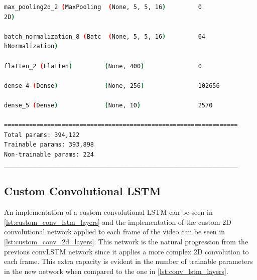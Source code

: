 \begin{lstlisting}[language=Bash,caption={Overview of layers in Convolutional LTSM network.},label={lst:conv_lstm_layers},numbers=none,float=htb]
max_pooling2d_2 (MaxPooling  (None, 5, 5, 16)         0         
2D)                                                             
                                                                
batch_normalization_8 (Batc  (None, 5, 5, 16)         64        
hNormalization)                                                 
                                                                
flatten_2 (Flatten)         (None, 400)               0         
                                                                
dense_4 (Dense)             (None, 256)               102656    
                                                                
dense_5 (Dense)             (None, 10)                2570      
                                                                
=================================================================
Total params: 394,122
Trainable params: 393,898
Non-trainable params: 224
_________________________________________________________________
\end{lstlisting}

\subsection{Custom Convolutional LSTM}

An implementation of a custom convolutional LSTM can be seen in \cref{lst:custom_conv_lstm_layers} and the implementation of the custom 2D convolutional network applied to each frame of the video can be seen in \cref{lst:custom_conv_2d_layers}. This network is the natural progression from the previous convLSTM network since it applies a more complex 2D convolution to each frame. This extra capacity is evident in the number of trainable parameters in the new network when compared to the one in \cref{lst:conv_lstm_layers}.

